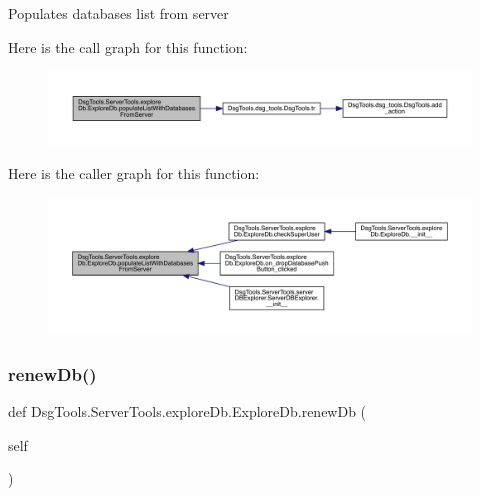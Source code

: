 \begin{DoxyVerb}Populates databases list from server
\end{DoxyVerb}
 Here is the call graph for this function\+:
\nopagebreak
\begin{figure}[H]
\begin{center}
\leavevmode
\includegraphics[width=350pt]{class_dsg_tools_1_1_server_tools_1_1explore_db_1_1_explore_db_a92e2b2f1b14fdcd6e227da04ad5e4309_cgraph}
\end{center}
\end{figure}
Here is the caller graph for this function\+:
\nopagebreak
\begin{figure}[H]
\begin{center}
\leavevmode
\includegraphics[width=350pt]{class_dsg_tools_1_1_server_tools_1_1explore_db_1_1_explore_db_a92e2b2f1b14fdcd6e227da04ad5e4309_icgraph}
\end{center}
\end{figure}
\mbox{\label{class_dsg_tools_1_1_server_tools_1_1explore_db_1_1_explore_db_a98e476625fcaa5decfe1a37a3871514c}} 
\subsubsection{\texorpdfstring{renew\+Db()}{renewDb()}}
{\footnotesize\ttfamily def Dsg\+Tools.\+Server\+Tools.\+explore\+Db.\+Explore\+Db.\+renew\+Db (\begin{DoxyParamCaption}\item[{}]{self }\end{DoxyParamCaption})}

